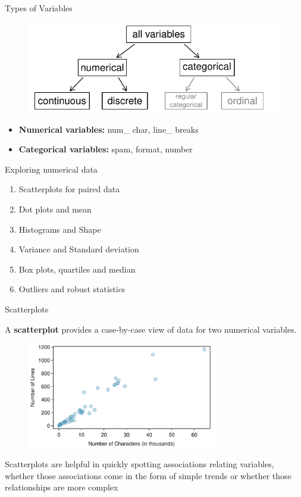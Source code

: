 \documentclass[12pt,a4paper]{beamer}
\begin{document}
\begin{frame}{Types of Variables}
\begin{figure}
\centering
\includegraphics[width=1\textwidth]{variables}
\label{variables}
\end{figure}
\begin{itemize}
\item[] \textbf{Numerical variables:} num\_ char, line\_ breaks
\item[]\textbf{Categorical variables:} spam, format, number
\end{itemize}
\end{frame}
\begin{frame}{Exploring numerical data}
	\begin{enumerate}
	\item  Scatterplots for paired data
	\item Dot plots and mean
	\item Histograms and Shape
	\item Variance and Standard deviation
	\item Box plots, quartiles and median
	\item Outliers and robust statistics
	\end{enumerate}
\end{frame}
\begin{frame}{Scatterplots}
	
	A \textbf{scatterplot} provides a case-by-case view of data for two numerical variables.
	\begin{figure}
	   \centering
	   \includegraphics[width=0.75\textwidth]{email50LinesCharacters}
	   \label{email50LinesCharacters}
	\end{figure}
	
\small Scatterplots are helpful in quickly spotting associations relating variables, whether those associations come in the form of simple trends or whether those relationships are more complex
\end{frame}
\end{document}
